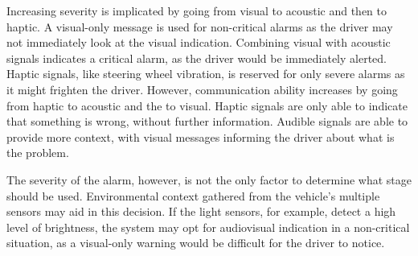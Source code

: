 Increasing severity is implicated by going from visual to acoustic and then to haptic. A visual-only message is used for non-critical alarms as the driver may not immediately look at the visual indication. Combining visual with acoustic signals indicates a critical alarm, as the driver would be immediately alerted. Haptic signals, like steering wheel vibration, is reserved for only severe alarms as it might frighten the driver. However, communication ability increases by going from haptic to acoustic and the to visual. Haptic signals are only able to indicate that something is wrong, without further information. Audible signals are able to provide more context, with visual messages informing the driver about what is the problem.\par
The severity of the alarm, however, is not the only factor to determine what stage should be used. Environmental context gathered from the vehicle's multiple sensors may aid in this decision. If the light sensors, for example, detect a high level of brightness, the system may opt for audiovisual indication in a non-critical situation, as a visual-only warning would be difficult for the driver to notice.